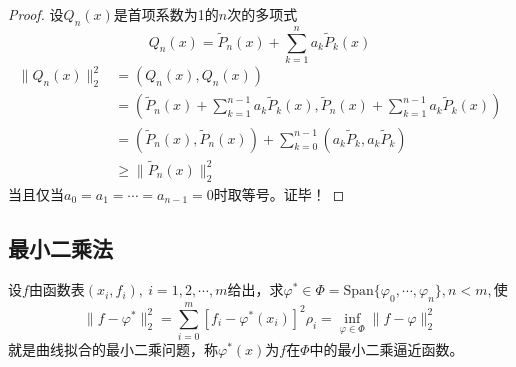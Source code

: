 \begin{proof}
    设$Q_{n}(x)$是首项系数为1的$n$次的多项式
    \[
        Q_{n}(x) = \tilde{P}_{n}(x)+\sum\limits_{k = 1}^{n}a_k\tilde{P}_{k}(x)    
    \]
    \[
        \begin{array}{ll}
            \|Q_{n}(x)\|_2^2 &= (Q_{n}(x),Q_{n}(x))\\
            &=(\tilde{P}_{n}(x)+\sum\limits_{k = 1}^{n-1}a_k\tilde{P}_{k}(x),\tilde{P}_{n}(x)+\sum\limits_{k = 1}^{n-1}a_k\tilde{P}_{k}(x))\\
            &=(\tilde{P}_{n}(x),\tilde{P}_{n}(x))+\sum\limits_{k = 0}^{n-1}(a_k\tilde{P}_{k},a_k\tilde{P}_{k})\\
            & \geqslant \|\tilde{P}_{n}(x)\|_{2}^{2}
        \end{array}
    \]
    当且仅当$a_0 = a_1 = \cdots = a_{n-1} = 0$时取等号。证毕！
\end{proof}
\subsection{最小二乘法}
\begin{definition}[最小二乘问题]
    设$f$由函数表$(x_i,f_i),\ i = 1,2,\cdots,m$给出，求$\varphi^{*}\in\Phi=\mathrm{Span}\{\varphi_{0},\cdots,\varphi_{n}\},n<m,$使
    \[
        \parallel f-\varphi^*\parallel_2^2=\sum_{i=0}^m[f_i-\varphi^*(x_i)]^2\rho_i=\inf_{\varphi\in\Phi}\parallel f-\varphi\parallel_2^2
    \]
    就是曲线拟合的最小二乘问题，称$\varphi^*(x)$为$f$在$\Phi$中的最小二乘逼近函数。
\end{definition}


